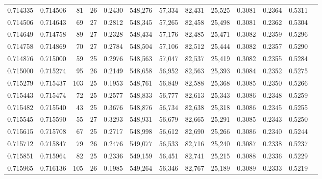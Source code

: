 \begin{tabular}{rrrrrrrrrrrrr}
0.714335 & 0.714506 &    81 &  26 &                                     0.2430 & 548,276 &  57,334 &  82,431 &  25,525 & 0.3081 & 0.2364 & 0.5311 \\
0.714506 & 0.714643 &    69 &  27 &                                     0.2812 & 548,345 &  57,265 &  82,458 &  25,498 & 0.3081 & 0.2362 & 0.5304 \\
0.714649 & 0.714758 &    89 &  27 &                                     0.2328 & 548,434 &  57,176 &  82,485 &  25,471 & 0.3082 & 0.2359 & 0.5296 \\
0.714758 & 0.714869 &    70 &  27 &                                     0.2784 & 548,504 &  57,106 &  82,512 &  25,444 & 0.3082 & 0.2357 & 0.5290 \\
0.714876 & 0.715000 &    59 &  25 &                                     0.2976 & 548,563 &  57,047 &  82,537 &  25,419 & 0.3082 & 0.2355 & 0.5284 \\
0.715000 & 0.715274 &    95 &  26 &                                     0.2149 & 548,658 &  56,952 &  82,563 &  25,393 & 0.3084 & 0.2352 & 0.5275 \\
0.715279 & 0.715437 &   103 &  25 &                                     0.1953 & 548,761 &  56,849 &  82,588 &  25,368 & 0.3085 & 0.2350 & 0.5266 \\
0.715443 & 0.715474 &    72 &  25 &                                     0.2577 & 548,833 &  56,777 &  82,613 &  25,343 & 0.3086 & 0.2348 & 0.5259 \\
0.715482 & 0.715540 &    43 &  25 &                                     0.3676 & 548,876 &  56,734 &  82,638 &  25,318 & 0.3086 & 0.2345 & 0.5255 \\
0.715545 & 0.715590 &    55 &  27 &                                     0.3293 & 548,931 &  56,679 &  82,665 &  25,291 & 0.3085 & 0.2343 & 0.5250 \\
0.715615 & 0.715708 &    67 &  25 &                                     0.2717 & 548,998 &  56,612 &  82,690 &  25,266 & 0.3086 & 0.2340 & 0.5244 \\
0.715712 & 0.715847 &    79 &  26 &                                     0.2476 & 549,077 &  56,533 &  82,716 &  25,240 & 0.3087 & 0.2338 & 0.5237 \\
0.715851 & 0.715964 &    82 &  25 &                                     0.2336 & 549,159 &  56,451 &  82,741 &  25,215 & 0.3088 & 0.2336 & 0.5229 \\
0.715965 & 0.716136 &   105 &  26 &                                     0.1985 & 549,264 &  56,346 &  82,767 &  25,189 & 0.3089 & 0.2333 & 0.5219 \\

\end{tabular}
